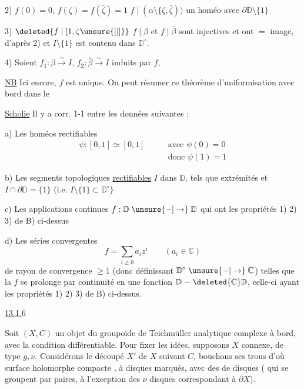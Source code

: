 2) $f(0)=0$, $f(\zeta)=f(\bar\zeta)=1$
$f\mid(\alpha\setminus\{\zeta,\bar\zeta))$   un
homéo avec $\partial\mathbb D\setminus\{1\}$

3) $\deleted{f\mid[1,\zeta\mathclose{\unsure{[|]}}}$ $f\mid\beta$ et $f\mid\bar\beta$ sont injectives et
ont $=$ image,   d'après
2) et $I\setminus\{1\}$ est contenu dans $\mathbb D^\circ$.

4) Soient $f_1:\beta\xrightarrow{\sim}I$, $f_2:\bar\beta\xrightarrow{\sim}I$ induits par $f$,

\uline{NB} Ici encore, $f$ est unique. On peut
résumer ce théorème d'uniformisation
avec bord dans le 

\uline{Scholie} Il y a corr. 1-1 entre les
données suivantes :

a) Les homéos rectifiables 
\[
\begin{aligned}
\psi:[0,1]\simeq[0,1] &\qquad\text{avec }\psi(0)=0\\
&\qquad\text{donc }\psi(1)=1
\end{aligned}
\]

b) Les segments topologiques \uline{rectifiables}
$I$ dans $\mathbb D$, tels que  
extrémités et 
$I\cap\partial\mathbb D=\{1\}$ (i.e.
$I\setminus\{1\}\subset\mathbb D^\circ\}$

c) Les  applications continues $f:\mathbb D\mathrel{\unsure{-|\to}}\mathbb D$
qui ont les propriétés 1) 2) 3) de B) ci-dessus

d) Les séries convergentes
\[
f=\sum_{i\geq0}a_i z^i\qquad(a_i\in\mathbb C)
\]
de rayon de convergence $\geq1$ (donc
définissant $\mathbb D^\circ\mathrel{\unsure{-|\to}}\mathbb C$)  telles que la $f$
se prolonge par continuité en une
fonction $\mathbb D\mathrel{-}\deleted{\mathbb C}\mathbb D$, celle-ci ayant les
propriétés 1) 2) 3) de B) ci-dessus.

\uline{13.1.}\qquad\textcircled{6}

Soit $(X,C)$ un objet du groupoïde
de Teichmüller analytique complexe
à bord, avec la condition différentiable.
Pour fixer les idées, supposons $X$ connexe,
de type $g,\nu$. Considérons le découpé $X'$
de $X$ suivant $C$, bouchons ses trous 
d'où surface holomorphe compacte , à disques
 marqués, avec des   de   disques
( qui se groupent par paires, à l'exception
des $\nu$ disques correspondant à $\partial X$).

